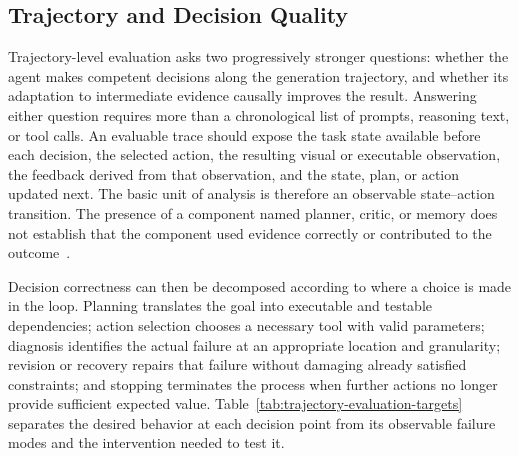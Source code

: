 \subsection{Trajectory and Decision Quality}
\label{subsec:trajectory-quality}

Trajectory-level evaluation asks two progressively stronger questions: whether the agent makes competent decisions along the generation trajectory, and whether its adaptation to intermediate evidence causally improves the result. Answering either question requires more than a chronological list of prompts, reasoning text, or tool calls. An evaluable trace should expose the task state available before each decision, the selected action, the resulting visual or executable observation, the feedback derived from that observation, and the state, plan, or action updated next. The basic unit of analysis is therefore an observable state--action transition. The presence of a component named planner, critic, or memory does not establish that the component used evidence correctly or contributed to the outcome~\cite{avg250915160,avg260526144,avg260608091}.

Decision correctness can then be decomposed according to where a choice is made in the loop. Planning translates the goal into executable and testable dependencies; action selection chooses a necessary tool with valid parameters; diagnosis identifies the actual failure at an appropriate location and granularity; revision or recovery repairs that failure without damaging already satisfied constraints; and stopping terminates the process when further actions no longer provide sufficient expected value. Table~\ref{tab:trajectory-evaluation-targets} separates the desired behavior at each decision point from its observable failure modes and the intervention needed to test it.

